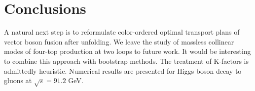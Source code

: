 \section{Conclusions}\label{sec:conclusions}

A natural next step is to reformulate color-ordered optimal transport
plans of vector boson fusion after unfolding. We leave the study of
massless collinear modes of four-top production at two loops to future
work. It would be interesting to combine this approach with bootstrap
methods. The treatment of K-factors is admittedly heuristic. Numerical
results are presented for Higgs boson decay to gluons at $\sqrt{s} =
91.2$ GeV.

